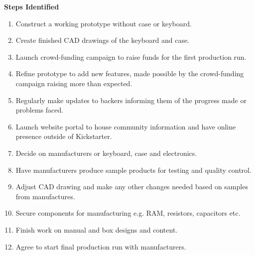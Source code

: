 \textbf{Steps Identified}
\begin{enumerate}
\item Construct a working prototype without case or keyboard. 
\item Create finished CAD drawings of the keyboard and case.
\item Launch crowd-funding campaign to raise funds for the first production run.
\item Refine prototype to add new features, made possible by the crowd-funding campaign raising more than expected. 
\item Regularly make updates to backers informing them of the progress made or problems faced.
\item Launch website portal to house community information and have online presence outside of Kickstarter.
\item Decide on manufacturers or keyboard, case and electronics.
\item Have manufacturers produce sample products for testing and quality control.
\item Adjust CAD drawing and make any other changes needed based on samples from manufactures.
\item Secure components for manufacturing e.g. RAM, resistors, capacitors etc. 
\item Finish work on manual and box designs and content.
\item Agree to start final production run with manufacturers. 
\end{enumerate} 

